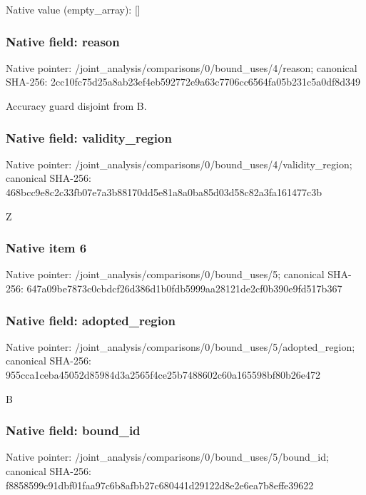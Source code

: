 \documentclass[10pt,a4paper]{article}
\begin{document}
Native value (empty\_\allowbreak{}array): []

\subsubsection{Native field: reason}
Native pointer: /joint\_\allowbreak{}analysis/comparisons/0/bound\_\allowbreak{}uses/4/reason; canonical SHA-256: 2cc10fc75d25a8ab23ef4eb592772e9a63c7706cc6564fa05b231c5a0df8d349

\begingroup\raggedright\sloppy Accuracy guard disjoint from B.\par\endgroup

\subsubsection{Native field: validity\_\allowbreak{}region}
Native pointer: /joint\_\allowbreak{}analysis/comparisons/0/bound\_\allowbreak{}uses/4/validity\_\allowbreak{}region; canonical SHA-256: 468bcc9e8c2c33fb07e7a3b88170dd5e81a8a0ba85d03d58c82a3fa161477c3b

\begingroup\raggedright\sloppy Z\par\endgroup

\subsubsection{Native item 6}
Native pointer: /joint\_\allowbreak{}analysis/comparisons/0/bound\_\allowbreak{}uses/5; canonical SHA-256: 647a09be7873c0cbdcf26d386d1b0fdb5999aa28121de2cf0b390e9fd517b367

\subsubsection{Native field: adopted\_\allowbreak{}region}
Native pointer: /joint\_\allowbreak{}analysis/comparisons/0/bound\_\allowbreak{}uses/5/adopted\_\allowbreak{}region; canonical SHA-256: 955cca1ceba45052d85984d3a2565f4ce25b7488602c60a165598bf80b26e472

\begingroup\raggedright\sloppy B\par\endgroup

\subsubsection{Native field: bound\_\allowbreak{}id}
Native pointer: /joint\_\allowbreak{}analysis/comparisons/0/bound\_\allowbreak{}uses/5/bound\_\allowbreak{}id; canonical SHA-256: f8858599c91dbf01faa97c6b8afbb27c680441d29122d8e2e6ea7b8effe39622
\end{document}
